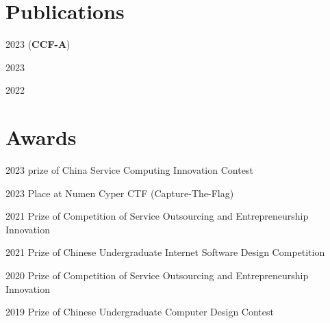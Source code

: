 \documentclass[12pt,letterpaper]{report}
\begin{document}
    \section*{Publications}
    \begin{tablist}
        \item[2023] \tab{} (\textbf{CCF-A})
        \item[2023] \tab{}
        \item[2022] \tab{}
    \end{tablist}


    \section*{Awards}
    \begin{tablist}
        \item[2023] \tab{} prize of China Service Computing Innovation Contest
        \item[2023] \tab{} Place at Numen Cyper CTF (Capture-The-Flag)
        \item[2021] \tab{} Prize of Competition of Service Outsourcing and Entrepreneurship Innovation
        \item[2021] \tab{} Prize of Chinese Undergraduate Internet Software Design Competition
        \item[2020] \tab{} Prize of Competition of Service Outsourcing and Entrepreneurship Innovation
        \item[2019] \tab{} Prize of Chinese Undergraduate Computer Design Contest
    \end{tablist}
\end{document}

